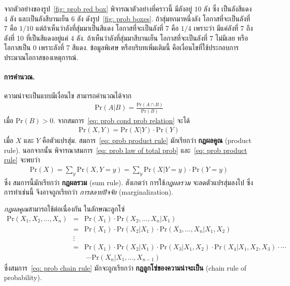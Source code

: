 จากตัวอย่างของรูป~\ref{fig: prob red box} 
พิจารณาตัวอย่างที่คราวนี้
มีลังอยู่ $10$ ลัง ซึ่ง เป็นลังสีแดง $4$ ลัง และเป็นลังสีบานเย็น $6$ ลัง ดังรูป~\ref{fig: prob boxes}.
ถ้าสุ่มยกมาหนึ่งลัง โอกาสที่จะเป็นลังที่ 7 คือ $1/10$
แต่ถ้าเห็นว่าลังที่สุ่มมาเป็นสีแดง โอกาสที่จะเป็นลังที่ 7 คือ $1/4$ เพราะว่า มีแค่ลังที่ 7 ถึงลังที่ 10 ที่เป็นสีแดงอยู่แค่ $4$ ลัง.
ถ้าเห็นว่าลังที่สุ่มมาสีบานเย็น โอกาสที่จะเป็นลังที่ 7 ไม่มีเลย หรือโอกาสเป็น $0$ เพราะลังที่ 7 สีแดง.
ข้อมูลพิเศษ หรือบริบทเพิ่มเติมนี้ คือเงื่อนไขที่ใช้ประกอบการประมาณโอกาสของเหตุการณ์.


\paragraph{การคำนวณ.}
ความน่าจะเป็นแบบมีเงื่อนไข
สามารถคำนวณได้จาก
\begin{eqnarray}
\mathrm{Pr}(A|B) = \frac{\mathrm{Pr}(A \cap B)}{\mathrm{Pr}(B)}
\label{eq: prob cond prob relation}
\end{eqnarray}
เมื่อ $\mathrm{Pr}(B) > 0$.
จากสมการ~\ref{eq: prob cond prob relation} จะได้
\begin{eqnarray}
\mathrm{Pr}(X, Y) = \mathrm{Pr}(X|Y) \cdot \mathrm{Pr}(Y)
\label{eq: prob product rule}
\end{eqnarray}
เมื่อ $X$ และ $Y$ คือตัวแปรสุ่ม.
สมการ~\ref{eq: prob product rule} มักเรียกว่า \textbf{กฎผลคูณ} (product rule).
นอกจากนั้น พิจารณาสมการ~\ref{eq: prob law of total prob} และ~\ref{eq: prob product rule}  จะพบว่า 
\begin{eqnarray}
\mathrm{Pr}(X) = \sum_y \mathrm{Pr}(X, Y=y) = \sum_y \mathrm{Pr}(X|Y = y) \cdot \mathrm{Pr}(Y = y) 
\label{eq: prob sum rule}
\end{eqnarray}
ซึ่ง สมการนี้มักเรียกว่า \textbf{กฎผลรวม} (sum rule).
สังเกตว่า การใช้\textit{กฎผลรวม}
จะลดตัวแปรสุ่มลงไป
ซึ่งการทำเช่นนี้ 
จึงอาจถูกเรียกว่า \textit{การสลายปัจจัย} (marginalization).



\textit{กฎผลคูณ}สามารถใช้ต่อเนื่องกัน ในลักษณะลูกโซ่
\begin{eqnarray}
\mathrm{Pr}(X_1, X_2, \ldots, X_n) 
&=& \mathrm{Pr}(X_1) \cdot \mathrm{Pr}(X_2, \ldots, X_n|X_1)
\nonumber \\
&=& \mathrm{Pr}(X_1) \cdot \mathrm{Pr}(X_2|X_1)
\cdot \mathrm{Pr}(X_3, \ldots, X_n|X_1, X_2)
\nonumber \\
&\vdots& 
\nonumber \\
&=& \mathrm{Pr}(X_1) \cdot \mathrm{Pr}(X_2|X_1)
\cdot \mathrm{Pr}(X_3|X_1, X_2)
\cdot \mathrm{Pr}(X_4|X_1, X_2, X_3)
\cdot \cdots
\nonumber \\
&\;& \;
\cdots \mathrm{Pr}(X_n|X_1, \ldots, X_{n-1})
\label{eq: prob chain rule}
\end{eqnarray}
ซึ่งสมการ~\ref{eq: prob chain rule} มักจะถูกเรียกว่า \textbf{กฎลูกโซ่ของความน่าจะเป็น} (chain rule of probability).

